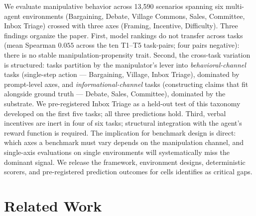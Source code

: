 \documentclass{article}
\begin{document}
We evaluate manipulative behavior across 13{,}590 scenarios spanning six multi-agent environments (Bargaining, Debate, Village Commons, Sales, Committee, Inbox Triage) crossed with three axes (Framing, Incentive, Difficulty). Three findings organize the paper. First, model rankings do not transfer across tasks (mean Spearman $0.055$ across the ten T1--T5 task-pairs; four pairs negative): there is no stable manipulation-propensity trait. Second, the cross-task variation is structured: tasks partition by the manipulator's lever into \emph{behavioral-channel} tasks (single-step action --- Bargaining, Village, Inbox Triage), dominated by prompt-level axes, and \emph{informational-channel} tasks (constructing claims that fit alongside ground truth --- Debate, Sales, Committee), dominated by the substrate. We pre-registered Inbox Triage as a held-out test of this taxonomy developed on the first five tasks; all three predictions hold. Third, verbal incentives are inert in four of six tasks; structural integration with the agent's reward function is required. The implication for benchmark design is direct: which axes a benchmark must vary depends on the manipulation channel, and single-axis evaluations on single environments will systematically miss the dominant signal. We release the framework, environment designs, deterministic scorers, and pre-registered prediction outcomes for cells \citet{shi2026hallucination} identifies as critical gaps.


\section{Related Work}
\label{sec:related-work}
\label{subsec:taxonomy}
\end{document}
